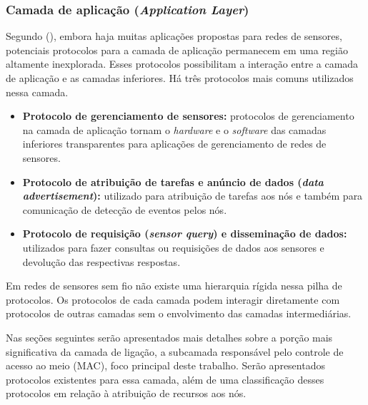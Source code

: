  \subsubsection{Camada de aplicação (\emph{Application Layer})}
 \label{sec:applicationLayer}
 
 Segundo  (\citeyear{Akyildiz2002}), embora haja muitas aplicações propostas para redes de sensores, potenciais protocolos para a camada de aplicação permanecem em uma região altamente inexplorada. Esses protocolos possibilitam a interação entre a camada de aplicação e as camadas inferiores. Há três protocolos mais comuns utilizados nessa camada. 
 
 \begin{itemize}
 \item \textbf{Protocolo de gerenciamento de sensores:} protocolos de gerenciamento na camada de aplicação tornam o \textit{hardware} e o \textit{software} das camadas inferiores transparentes para aplicações de gerenciamento de redes de sensores.
 \item \textbf{Protocolo de atribuição de tarefas e anúncio de dados (\textit{data advertisement}):} utilizado para atribuição de tarefas aos nós e também para comunicação de detecção de eventos pelos nós.
 \item \textbf{Protocolo de requisição (\textit{sensor query}) e disseminação de dados:} utilizados para fazer consultas ou requisições de dados aos sensores e devolução das respectivas respostas.
 \end{itemize}
 
Em redes de sensores sem fio não existe uma hierarquia rígida nessa pilha de protocolos. Os protocolos de cada camada podem interagir diretamente com protocolos de outras camadas sem o envolvimento das camadas intermediárias.

Nas seções seguintes serão apresentados mais detalhes sobre a porção mais significativa da camada de ligação, a subcamada responsável pelo controle de acesso ao meio (MAC), foco principal deste trabalho. Serão apresentados protocolos existentes para essa camada, além de uma classificação desses protocolos em relação à atribuição de recursos aos nós.